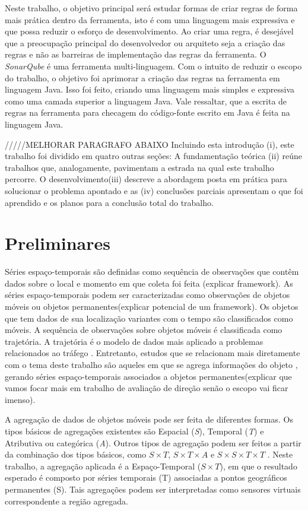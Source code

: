 \documentclass[12pt]{report} %
\begin{document}
Neste trabalho, o objetivo principal será estudar formas de criar regras de forma mais prática dentro da ferramenta, isto é com uma linguagem mais expressiva e que possa reduzir o esforço de desenvolvimento. Ao criar uma regra, é desejável que a preocupação principal do desenvolvedor ou arquiteto seja a criação das regras e não as barreiras de implementação das regras da ferramenta. O \textit{SonarQube} é uma ferramenta multi-linguagem. Com o intuito de reduzir o escopo do trabalho, o objetivo foi aprimorar a criação das regras na ferramenta em linguagem Java. Isso foi feito, criando uma linguagem mais simples e expressiva como uma camada superior a linguagem Java. Vale ressaltar, que a escrita de regras na ferramenta para checagem do código-fonte escrito em Java é feita na linguagem Java.

/////MELHORAR PARAGRAFO ABAIXO
Incluindo esta introdução (i), este trabalho foi dividido em quatro outras seções: A fundamentação teórica (ii) reúne trabalhos que, analogamente, pavimentam a estrada na qual este trabalho percorre. O desenvolvimento(iii) descreve a abordagem posta em prática para solucionar o problema apontado e as (iv) conclusões parciais apresentam o que foi aprendido e os planos para a conclusão total do trabalho.


\chapter{Preliminares}
\label{sec:background}
Séries espaço-temporais são definidas como sequência de observações que contêm dados sobre o local e momento em que coleta foi feita \citep{cressie2015statistics}(explicar framework). As séries espaço-temporais podem ser caracterizadas como observações de objetos móveis ou objetos permanentes(explicar potencial de um framework). Os objetos que tem dados de sua localização variantes com o tempo são classificados como móveis. A sequência de observações sobre objetos móveis é classificada como trajetória. A trajetória é o modelo de dados mais aplicado a problemas relacionados ao tráfego \citep{chen2015survey}. Entretanto, estudos que se relacionam mais diretamente com o tema deste trabalho são aqueles em que se agrega informações do objeto \citep{tao2004spatio}, gerando séries espaço-temporais associados a objetos permanentes(explicar que vamos focar mais em trabalho de avaliação de direção senão o escopo vai ficar imenso).

A agregação de dados de objetos móveis pode ser feita de diferentes formas. Os tipos básicos de agregações existentes são Espacial (\emph{S}), Temporal (\emph{T}) e Atributiva ou categórica (\emph{A}). Outros tipos de agregação podem ser feitos a partir da combinação dos tipos básicos, como \emph{$S \times T$}, \emph{$S \times T \times A$} e \emph{$S \times S \times T \times T$} \citep{chen2015survey}. Neste trabalho, a agregação aplicada é a Espaço-Temporal (\emph{$S \times T$}), em que o resultado esperado é composto por séries temporais (T) associadas a pontos geográficos permanentes (S). Tais agregações podem ser interpretadas como sensores virtuais correspondente a região agregada.  
\end{document}
